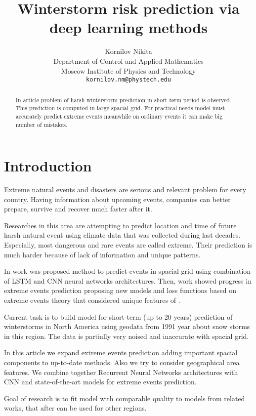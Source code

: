 \documentclass{article}
\title{Winterstorm risk prediction via deep learning methods}
\author{ Kornilov Nikita\\
	Department of Control and Applied Mathematics\\
	Moscow Institute of Physics and Technology\\
	\texttt{kornilov.nm@phystech.edu} \\
}
\date{}
\begin{document}
\maketitle

\begin{abstract}
	In article problem of  harsh winterstorm prediction in short-term period is observed. This prediction is computed in large spacial grid. For practical needs model must accurately predict extreme events meanwhile on ordinary events it can make big number of mistakes. 
\end{abstract}



\section{Introduction}
Extreme natural events and disasters are serious and relevant problem for every country. Having information about upcoming events, companies can better prepare, survive and recover much faster after it. 

Researches in this area are attempting to predict location and time of future harsh natural event using climate data that was collected during last decades. Especially, most dangerous and rare events are called extreme. Their prediction is much harder because of lack of information and unique patterns.

In work \cite{LSTMCNN:2} was proposed method to predict events in spacial grid using combination of LSTM and CNN  neural networks architectures. Then, work \cite{EVL:1} showed progress in extreme events prediction proposing new models and loss functions based on extreme events theory that considered unique features of .

Current task is to build model for short-term (up  to 20 years) prediction of winterstorms in North America using geodata from 1991 year about snow storms in this region. The data is partially very noised and inaccurate with spacial grid. 

In this article we expand extreme events prediction adding important spacial components to up-to-date methods. Also we $\text{try}$ to consider geographical area features. We combine together Recurrent Neural Networks architectures with CNN and state-of-the-art models for extreme events prediction.

Goal of research is to fit model with comparable quality to models from related works, that after can be used for other regions.
 
\end{document}
